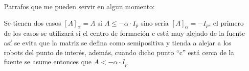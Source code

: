 Parrafos que me pueden servir en algun momento:


Se tienen dos casos ${\left[A\right]}_{\alpha }=A$ si $A\le -\alpha \cdot{I}_{p}$  sino seria  ${\left[A\right]}_{\alpha }=-I_p$, el primero de los casos se utilizará si el centro de formación c está muy alejado de la fuente así se evita que la matriz se defina como semipositiva y tienda a alejar a los robots del punto de interés, además, cuando dicho punto ``c'' está cerca de la fuente se asume entonces que $A<-\alpha \cdot{I}_{p}$
